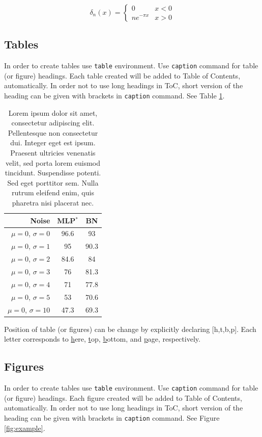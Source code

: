 \documentclass[a4paper,12pt]{article}
\begin{document}
\begin{equation}
    \delta_n(x) = 
    \begin{cases}
        0 & x < 0 \\
        ne^{-\pi x} & x > 0
    \end{cases}
\end{equation}


\subsection{Tables}
In order to create tables use \texttt{table} environment. Use \texttt{caption} command for table (or figure) headings. Each table created will be added to Table of Contents, automatically. In order not to use long headings in ToC, short version of the heading can be given with brackets in \texttt{caption} command. See Table \ref{tab:example}.

\begin{table}[h]
    \centering
        \begin{tabular}{r|c c}
         \textbf{Noise} & \textbf{MLP$^*$} & \textbf{BN} \\ \hline 
         $\mu=0$, $\sigma=0$ & 96.6 & 93 \\ 
         $\mu=0$, $\sigma=1$ & 95 & 90.3 \\ 
         $\mu=0$, $\sigma=2$ & 84.6 & 84 \\ 
         $\mu=0$, $\sigma=3$ & 76 & 81.3 \\ 
         $\mu=0$, $\sigma=4$ & 71 & 77.8 \\ 
         $\mu=0$, $\sigma=5$ & 53 & 70.6 \\ 
         $\mu=0$, $\sigma=10$ & 47.3 & 69.3 \\ 
    \end{tabular}
    \caption[Short version of heading for example table]{Lorem ipsum dolor sit amet, consectetur adipiscing elit. Pellentesque non consectetur dui. Integer eget est ipsum. Praesent ultricies venenatis velit, sed porta lorem euismod tincidunt. Suspendisse potenti. Sed eget porttitor sem. Nulla rutrum eleifend enim, quis pharetra nisi placerat nec.}
    \label{tab:example}
\end{table}

Position of table (or figures) can be change by explicitly declaring [h,t,b,p]. Each letter corresponds to \underline{h}ere, \underline{t}op, \underline{b}ottom, and \underline{p}age, respectively.


\subsection{Figures}
In order to create tables use \texttt{table} environment. Use \texttt{caption} command for table (or figure) headings. Each figure created will be added to Table of Contents, automatically. In order not to use long headings in ToC, short version of the heading can be given with brackets in \texttt{caption} command. See Figure \ref{fig:example}.
\end{document}
